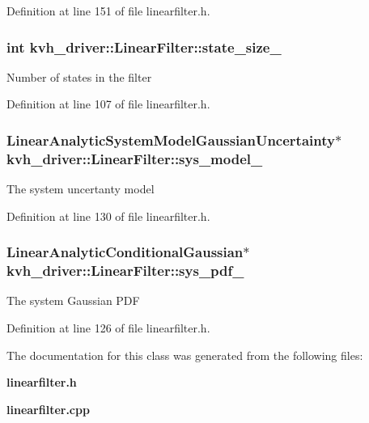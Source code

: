 \-Definition at line 151 of file linearfilter.\-h.

\subsubsection[{state\-\_\-size\-\_\-}]{\setlength{\rightskip}{0pt plus 5cm}int {\bf kvh\-\_\-driver\-::\-Linear\-Filter\-::state\-\_\-size\-\_\-}\hspace{0.3cm}{\ttfamily  [protected]}}\label{classkvh__driver_1_1LinearFilter_ae8b218002fbc40aee0ff5aed79952d2c}
\-Number of states in the filter 

\-Definition at line 107 of file linearfilter.\-h.

\subsubsection[{sys\-\_\-model\-\_\-}]{\setlength{\rightskip}{0pt plus 5cm}\-Linear\-Analytic\-System\-Model\-Gaussian\-Uncertainty$\ast$ {\bf kvh\-\_\-driver\-::\-Linear\-Filter\-::sys\-\_\-model\-\_\-}\hspace{0.3cm}{\ttfamily  [protected]}}\label{classkvh__driver_1_1LinearFilter_a0fe6a7f2d41a6e89456c3d9044d3ce75}
\-The system uncertanty model 

\-Definition at line 130 of file linearfilter.\-h.

\subsubsection[{sys\-\_\-pdf\-\_\-}]{\setlength{\rightskip}{0pt plus 5cm}\-Linear\-Analytic\-Conditional\-Gaussian$\ast$ {\bf kvh\-\_\-driver\-::\-Linear\-Filter\-::sys\-\_\-pdf\-\_\-}\hspace{0.3cm}{\ttfamily  [protected]}}\label{classkvh__driver_1_1LinearFilter_a2c83779a70759426a11293ff8b7ccf91}
\-The system \-Gaussian \-P\-D\-F 

\-Definition at line 126 of file linearfilter.\-h.



\-The documentation for this class was generated from the following files\-:\begin{DoxyCompactItemize}
\item 
{\bf linearfilter.\-h}\item 
{\bf linearfilter.\-cpp}\end{DoxyCompactItemize}
